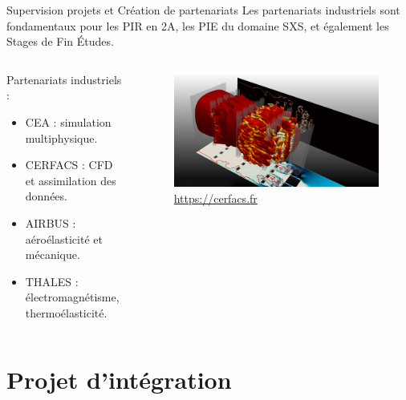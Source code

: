 \documentclass[aspectratio=169, french]{beamer}
\begin{document}
\begin{frame}{Supervision projets et Création de partenariats}	
Les partenariats industriels sont fondamentaux pour les PIR en 2A, les PIE du domaine SXS, et également les Stages de Fin Études.


\begin{columns}
	\begin{column}{.5\textwidth}
	Partenariats industriels : 
	\begin{itemize}
		\item CEA : simulation multiphysique.
		\item CERFACS : CFD et assimilation des données. 
		\item AIRBUS : aéroélasticité et mécanique.
		\item THALES : électromagnétisme, thermoélasticité.
	\end{itemize}
	\end{column}
	\begin{column}{.43\textwidth}
	\begin{figure}
		\includegraphics[width=1\textwidth]{image_CERFACS.png}
		\caption{\href{https://cerfacs.fr/logiciels-de-simulation-pour-la-mecanique-des-fluides/}{https://cerfacs.fr}}
	\end{figure}	
	\end{column}
\end{columns}
	
\end{frame}

\section{Projet d'intégration}
\end{document}

